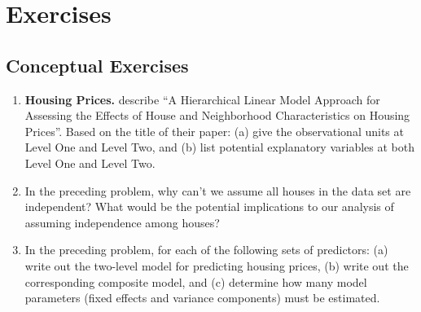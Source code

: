 \documentclass[
]{krantz}
\begin{document}
\hypertarget{exercises-7}{%
\section{Exercises}\label{exercises-7}}

\hypertarget{conceptual-exercises-5}{%
\subsection{Conceptual Exercises}\label{conceptual-exercises-5}}

\begin{enumerate}
\def\labelenumi{\arabic{enumi}.}
\item
  \textbf{Housing Prices.} \citet{Brown2004} describe ``A Hierarchical Linear Model Approach for Assessing the Effects of House and Neighborhood Characteristics on Housing Prices''. Based on the title of their paper: (a) give the observational units at Level One and Level Two, and (b) list potential explanatory variables at both Level One and Level Two.
\item
  In the preceding problem, why can't we assume all houses in the data set are independent? What would be the potential implications to our analysis of assuming independence among houses?
\item
  In the preceding problem, for each of the following sets of predictors: (a) write out the two-level model for predicting housing prices, (b) write out the corresponding composite model, and (c) determine how many model parameters (fixed effects and variance components) must be estimated.


\end{enumerate}
\end{document}
